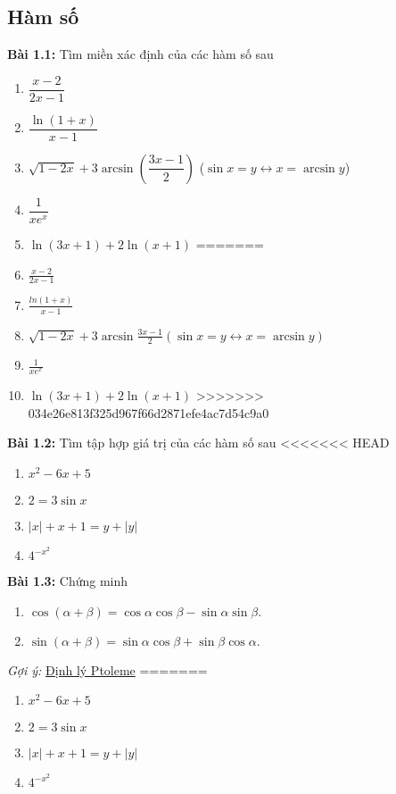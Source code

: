 \subsection*{Hàm số}
\textbf{Bài 1.1:} Tìm miền xác định của các hàm số sau
\begin{enumerate}[label=(\alph*)]
<<<<<<< HEAD
\item $\dfrac{x-2}{2x-1}$
\item $\dfrac{\ln(1+x)}{x-1}$
\item $\sqrt{1-2x}+3\arcsin\left(\dfrac{3x-1}{2}\right)$ \quad ($\sin{x}=y\leftrightarrow x=\arcsin y$)
\item $\dfrac{1}{x e^x}$
\item $\ln{(3x+1)}+2\ln{(x+1)}$
=======
\item \(\frac{x-2}{2x-1}\)
\item \(\frac{ln(1+x)}{x-1}\)
\item \(\sqrt{1-2x}+3\arcsin\frac{3x-1}{2} (\sin{x}=y\leftrightarrow x=\arcsin y) \)
\item \(\frac{1}{xe^x}\)
\item \(\ln{(3x+1)}+2\ln{(x+1)}\)
>>>>>>> 034e26e813f325d967f66d2871efe4ac7d54c9a0
\end{enumerate}

\vspace{5pt}
\textbf{Bài 1.2:} Tìm tập hợp giá trị của các hàm số sau
<<<<<<< HEAD
\begin{enumerate}[label=(\alph*)]
\item $x^2 -6x+5$
\item $2=3\sin x$
\item $|x| + x + 1 = y + |y|$
\item $4^{-x^2}$
\end{enumerate}
\vspace{5pt}

\textbf{Bài 1.3:} Chứng minh
\begin{enumerate}[label=(\alph*)]
\item $\cos(\alpha+\beta)=\cos\alpha\cos\beta - \sin\alpha\sin\beta.$
\item $\sin(\alpha+\beta)=\sin\alpha\cos\beta + \sin\beta\cos\alpha.$
\end{enumerate}

\emph{Gợi ý:} \href{https://vi.wikipedia.org/wiki/%C4%90%E1%BB%8Bnh_l%C3%BD_Ptoleme}{Định lý Ptoleme}
=======

\begin{enumerate}[label=(\alph*)]
\item \(x^2 -6x+5\)
\item \(2=3\sin x\)
\item \(\lvert x\rvert +x+1=y+\lvert y\rvert\)
\item \(4^{-x^2}\)
\end{enumerate}


